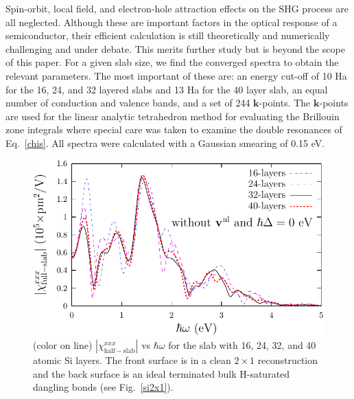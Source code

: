 \documentclass[floatfix,prb,aps,superscriptaddress,showpacs,11pt,preprint,letterpaper]{revtex4}
\begin{document}
Spin-orbit, local field, and electron-hole 
attraction\cite{beyond}
effects on the SHG process are all neglected.
Although these are important factors in the optical response of a semiconductor,
their efficient calculation is still theoretically and  
numerically challenging and  
under debate. This merits further study but is beyond the scope of this paper.
For a given slab size, we find the converged spectra 
to obtain the relevant parameters. The most important of 
these are: an energy cut-off of 10 Ha for the 16, 24, and 32 layered
slabs
and 13 Ha for the 40 layer slab,
an equal number of conduction and 
valence bands, and a set of 244 $\mathbf{k}$-points.
The $\mathbf{k}$-points are used for the linear analytic 
tetrahedron method for evaluating the
Brillouin zone integrals 
where special care was taken to examine the double resonances
of Eq.~\eqref{chis}. \cite{nastosPRB05}
All spectra were calculated with a Gaussian smearing of 0.15 eV.
\begin{figure}
\centering 
\includegraphics[scale=.8]{fig3}
\caption{(color on line) 
$|\chi_{\mathrm{half-slab}}^{xxx}|$ vs $\hbar\omega$ 
for the slab
with 16, 24, 32, and 40 atomic Si layers. The front surface 
is in a clean $2\times 1$ reconstruction and the back 
surface is an ideal terminated bulk H-saturated dangling bonds (see Fig.~\ref{si2x1}).
\label{fig1}} 
\end{figure}
\end{document}
